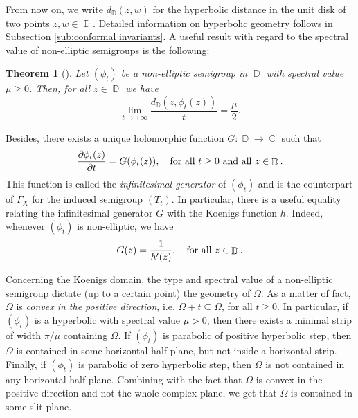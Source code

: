 \documentclass[11pt]{amsart}
\numberwithin{equation}{section}
\newtheorem{theorem}{Theorem}[section]
\theoremstyle{definition}
\DeclareMathOperator{\C}{\mathbb{C}}
\DeclareMathOperator{\D}{\mathbb{D}}
\begin{document}
	\textup{From now on, we write $d_{\D}(z,w)$ for the hyperbolic distance in the unit disk of two points $z,w\in\D$. Detailed information on hyperbolic geometry follows in Subsection \ref{sub:conformal invariants}.} A useful result with regard to the spectral value of non-elliptic semigroups is the following:
	\begin{theorem}[{\cite[Theorem 9.1.9]{Booksem}}]\label{thm:total speed}
		Let $(\phi_t)$ be a non-elliptic semigroup in $\D$ with spectral value $\mu\ge0$. Then, for all $z\in\D$ we have
		$$\lim\limits_{t\to+\infty}\dfrac{d_{\D}(z,\phi_t(z))}{t}=\dfrac{\mu}{2}.$$
	\end{theorem}
	Besides, there exists a unique holomorphic function $G:\D\to\C$ such that
	\begin{equation*}
		\dfrac{\partial\phi_t(z)}{\partial t}=G(\phi_t(z)), \quad\textup{for all }t\ge0 \textup{ and all }z\in\D.	
	\end{equation*}
	This function is called the \textit{infinitesimal generator} of $(\phi_t)$ and is the counterpart of $\Gamma_X$ for the induced semigroup $(T_t)$. In particular, there is a useful equality relating the infinitesimal generator $G$ with the Koenigs function $h$. Indeed, whenever $(\phi_t)$ is non-elliptic, we have
	\begin{equation}\label{eq:generator non-elliptic}
		G(z)=\dfrac{1}{h'(z)}, \quad\textup{for all }z\in\D.
	\end{equation}
	
	Concerning the Koenigs domain, the type and spectral value of a non-elliptic semigroup dictate (up to a certain point) the geometry of $\Omega$. As a matter of fact, $\Omega$ is \textit{convex in the positive direction}, i.e. $\Omega+t\subseteq\Omega$, for all $t\ge0$. In particular, if $(\phi_t)$ is a hyperbolic with spectral value $\mu>0$, then there exists a minimal strip of width $\pi/\mu$ containing $\Omega$. If $(\phi_t)$ is parabolic of positive hyperbolic step, then $\Omega$ is contained in some horizontal half-plane, but not inside a horizontal strip. Finally, if $(\phi_t)$ is parabolic of zero hyperbolic step, then $\Omega$ is not contained in any horizontal half-plane. Combining with the fact that $\Omega$ is convex in the positive direction and not the whole complex plane, we get that $\Omega$ is contained in some slit plane. 
	
\end{document}
